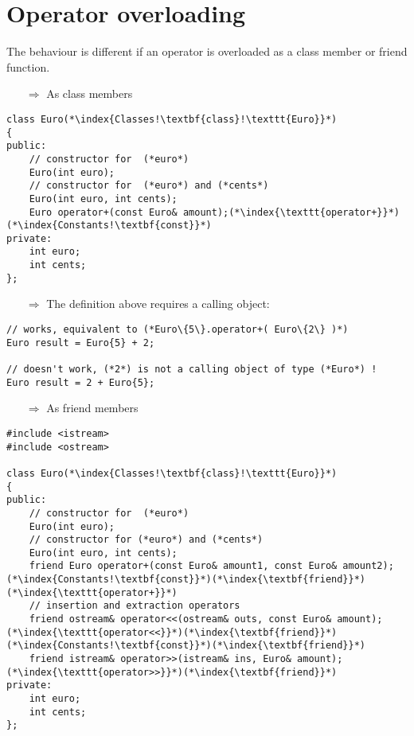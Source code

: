 \documentclass[10pt]{article}
\begin{document}
\section{Operator overloading}
\small
The behaviour is different if an operator is overloaded as  a class member or friend function.
\begin{enumerate}
\item[$\Rightarrow$] As class members
\end{enumerate}
\begin{lstlisting}
class Euro(*\index{Classes!\textbf{class}!\texttt{Euro}}*)
{
public:
    // constructor for  (*euro*)
    Euro(int euro);
    // constructor for  (*euro*) and (*cents*)
    Euro(int euro, int cents);
    Euro operator+(const Euro& amount);(*\index{\texttt{operator+}}*)(*\index{Constants!\textbf{const}}*)
private:
    int euro;
    int cents;
};
\end{lstlisting}
\begin{enumerate}
\item[$\Rightarrow$] The definition above requires a calling object:
\end{enumerate}
\begin{lstlisting}
// works, equivalent to (*Euro\{5\}.operator+( Euro\{2\} )*)
Euro result = Euro{5} + 2; 

// doesn't work, (*2*) is not a calling object of type (*Euro*) !
Euro result = 2 + Euro{5}; 
\end{lstlisting}
\begin{enumerate}
\item[$\Rightarrow$] As friend members
\end{enumerate}
\begin{lstlisting}
#include <istream>
#include <ostream>

class Euro(*\index{Classes!\textbf{class}!\texttt{Euro}}*)
{
public:
    // constructor for  (*euro*)
    Euro(int euro);
    // constructor for (*euro*) and (*cents*)
    Euro(int euro, int cents);
    friend Euro operator+(const Euro& amount1, const Euro& amount2);(*\index{Constants!\textbf{const}}*)(*\index{\textbf{friend}}*)(*\index{\texttt{operator+}}*)
    // insertion and extraction operators
    friend ostream& operator<<(ostream& outs, const Euro& amount);(*\index{\texttt{operator<<}}*)(*\index{\textbf{friend}}*)(*\index{Constants!\textbf{const}}*)(*\index{\textbf{friend}}*)
    friend istream& operator>>(istream& ins, Euro& amount);(*\index{\texttt{operator>>}}*)(*\index{\textbf{friend}}*)
private:
    int euro;
    int cents;
};
\end{lstlisting}
\end{document}
